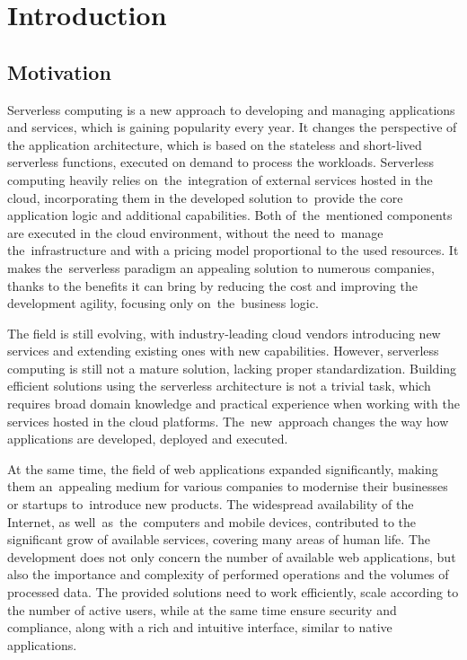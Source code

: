 \chapter{Introduction}

\section{Motivation}

Serverless computing is a new approach to developing and managing applications and services, which is gaining popularity every year.
It changes the perspective of the application architecture, which is based on the stateless and short-lived serverless functions, executed on demand to process the workloads.
Serverless computing heavily relies on~the~integration of external services hosted in the cloud, incorporating them in the developed solution to~provide the core application logic and additional capabilities.
Both of~the~mentioned components are executed in the cloud environment, without the need to~manage the~infrastructure and with a pricing model proportional to the used resources.
It makes the~serverless paradigm an appealing solution to numerous companies, thanks to the benefits it can bring by reducing the cost and improving the development agility, focusing only on~the~business logic.

The field is still evolving, with industry-leading cloud vendors introducing new services and extending existing ones with new capabilities.
However, serverless computing is still not a mature solution, lacking proper standardization.
Building efficient solutions using the serverless architecture is not a trivial task, which requires broad domain knowledge and practical experience when working with the services hosted in the cloud platforms.
The~new~approach changes the way how applications are developed, deployed and executed.

At the same time, the field of web applications expanded significantly, making them an~appealing medium for various companies to modernise their businesses or startups to~introduce new products.
The widespread availability of the Internet, as well~as~the~computers and mobile devices, contributed to the significant grow of available services, covering many areas of human life.
The development does not only concern the number of available web applications, but also the importance and complexity of performed operations and the volumes of processed data.
The provided solutions need to work efficiently, scale according to the number of active users, while at the same time ensure security and compliance, along with a rich and intuitive interface, similar to native applications.

